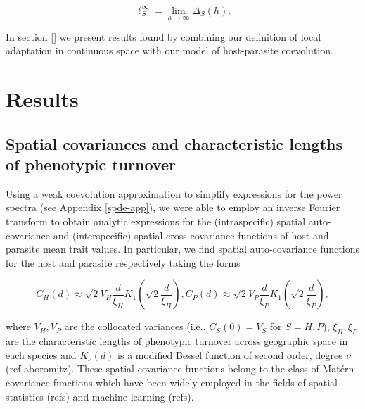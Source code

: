 \documentclass{article}
\begin{document}
\begin{equation}\label{la-cont-sp}
  \ell_S^\infty=\lim_{h\to\infty}\Delta_S(h).
\end{equation}

In section \ref{} we present results found by combining our definition
of local adaptation in continuous space with our model of host-parasite
coevolution.

\hypertarget{results}{%
\section{Results}\label{results}}

\hypertarget{spatial-covariances-and-characteristic-lengths-of-phenotypic-turnover}{%
\subsection{Spatial covariances and characteristic lengths of phenotypic
turnover}\label{spatial-covariances-and-characteristic-lengths-of-phenotypic-turnover}}

Using a weak coevolution approximation to simplify expressions for the
power spectra (see Appendix \ref{spde-app}), we were able to employ an
inverse Fourier transform to obtain analytic expressions for the
(intraspecific) spatial auto-covariance and (interspecific) spatial
cross-covariance functions of host and parasite mean trait values. In
particular, we find spatial auto-covariance functions for the host and
parasite respectively taking the forms

\begin{subequations}
  \begin{equation}
    C_H(d)\approx\sqrt2V_H\frac{d}{\xi_H}K_1\left(\sqrt2\frac{d}{\xi_H}\right),
  \end{equation}
  \begin{equation}
    C_P(d)\approx\sqrt2V_P\frac{d}{\xi_P}K_1\left(\sqrt2\frac{d}{\xi_P}\right),
  \end{equation}
\end{subequations}

where \(V_H,V_P\) are the collocated variances (i.e., \(C_S(0)=V_S\) for
\(S=H,P\)), \(\xi_H,\xi_P\) are the characteristic lengths of phenotypic
turnover across geographic space in each species and \(K_\nu(d)\) is a
modified Bessel function of second order, degree \(\nu\) (ref
aboromitz). These spatial covariance functions belong to the class of
Matérn covariance functions which have been widely employed in the
fields of spatial statistics (refs) and machine learning (refs).
\end{document}
